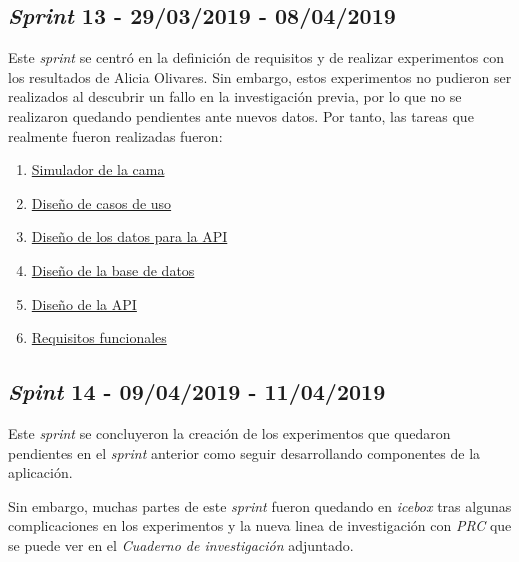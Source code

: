 \subsection{\textit{Sprint} 13 - 29/03/2019 - 08/04/2019}
Este \textit{sprint} se centró en la definición de requisitos y de realizar experimentos con los resultados de Alicia Olivares. Sin embargo, estos experimentos no pudieron ser realizados al descubrir un fallo en la investigación previa, por lo que no se realizaron quedando pendientes ante nuevos datos. Por tanto, las tareas que realmente fueron realizadas fueron:

\begin{enumerate}\addtocounter{enumi}{49}
	\item
	\href{https://github.com/joselucross/TFG-SmartBeds/issues/50}{Simulador de la cama}
	\addtocounter{enumi}{1}
	\item
	\href{https://github.com/joselucross/TFG-SmartBeds/issues/52}{Diseño de casos de uso}
	\item
	\href{https://github.com/joselucross/TFG-SmartBeds/issues/53}{Diseño de los datos para la API}
	\item
	\href{https://github.com/joselucross/TFG-SmartBeds/issues/54}{Diseño de la base de datos}
	\addtocounter{enumi}{2}
	\item
	\href{https://github.com/joselucross/TFG-SmartBeds/issues/56}{Diseño de la API}
	\item
	\href{https://github.com/joselucross/TFG-SmartBeds/issues/57}{Requisitos funcionales}
\end{enumerate} 

\subsection{\textit{Spint} 14 - 09/04/2019 - 11/04/2019 }
Este \textit{sprint} se concluyeron la creación de los experimentos que quedaron pendientes en el \textit{sprint} anterior como seguir desarrollando componentes de la aplicación. 

Sin embargo, muchas partes de este \textit{sprint} fueron quedando en \textit{icebox} tras algunas complicaciones en los experimentos y la nueva linea de investigación con \textit{PRC} que se puede ver en el \textit{Cuaderno de investigación} adjuntado. 

